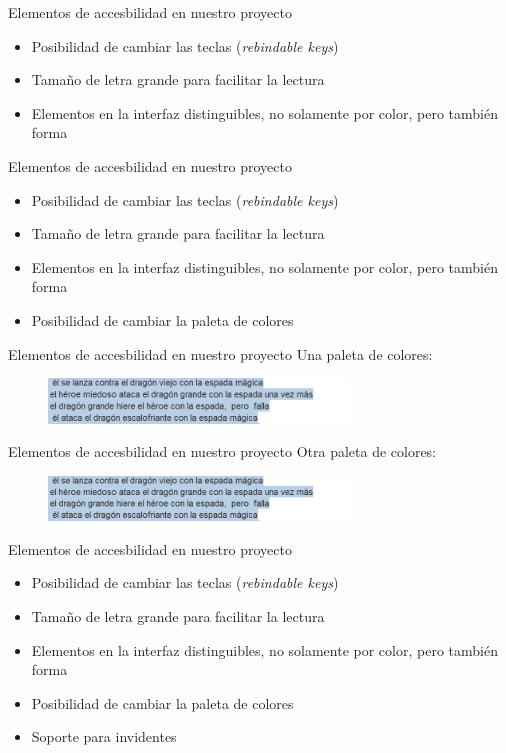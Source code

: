 \begin{tframe}{Elementos de accesbilidad en nuestro proyecto}
	\begin{itemize}
		\item Posibilidad de cambiar las teclas (\textit{rebindable keys})
		\item Tamaño de letra grande para facilitar la lectura
		\item<+-| alert@+> Elementos en la interfaz distinguibles, no solamente por color, pero también forma
	\end{itemize}
\end{tframe}

\begin{tframe}{Elementos de accesbilidad en nuestro proyecto}
	\begin{itemize}
		\item Posibilidad de cambiar las teclas (\textit{rebindable keys})
		\item Tamaño de letra grande para facilitar la lectura
		\item Elementos en la interfaz distinguibles, no solamente por color, pero también forma
		\item<+-| alert@+> Posibilidad de cambiar la paleta de colores
	\end{itemize}
\end{tframe}

\begin{tframe}{Elementos de accesbilidad en nuestro proyecto}
	Una paleta de colores:
		\begin{figure}[h]
			\includegraphics[width=8cm]{../img/temporalidadAtaque.PNG}
		\end{figure}
\end{tframe}

\begin{tframe}{Elementos de accesbilidad en nuestro proyecto}
	Otra paleta de colores:
		\begin{figure}[h]
			\includegraphics[width=8cm]{../img/temporalidadAtaque.PNG}
		\end{figure}
\end{tframe}

\begin{tframe}{Elementos de accesbilidad en nuestro proyecto}
	\begin{itemize}
		\item Posibilidad de cambiar las teclas (\textit{rebindable keys})
		\item Tamaño de letra grande para facilitar la lectura
		\item Elementos en la interfaz distinguibles, no solamente por color, pero también forma
		\item Posibilidad de cambiar la paleta de colores
		\item<+-| alert@+> Soporte para invidentes
	\end{itemize}
\end{tframe}

